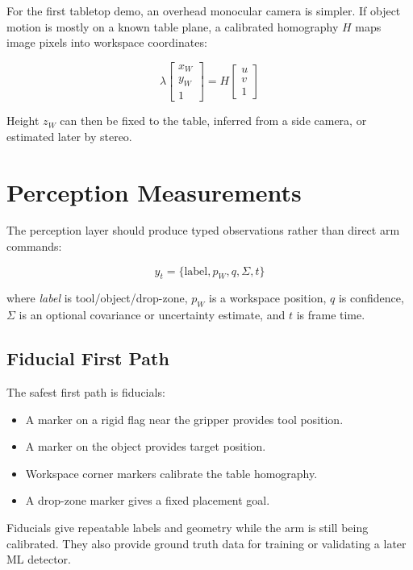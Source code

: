 \documentclass[11pt]{article}
\begin{document}
For the first tabletop demo, an overhead monocular camera is simpler. If object
motion is mostly on a known table plane, a calibrated homography $H$ maps image
pixels into workspace coordinates:

\[
    \lambda
    \begin{bmatrix}
    x_W \\ y_W \\ 1
    \end{bmatrix}
    =
    H
    \begin{bmatrix}
    u \\ v \\ 1
    \end{bmatrix}
\]

Height $z_W$ can then be fixed to the table, inferred from a side camera, or
estimated later by stereo.

\section{Perception Measurements}

The perception layer should produce typed observations rather than direct arm
commands:

\[
    y_t = \{\text{label}, p_W, q, \Sigma, t\}
\]

where \textit{label} is tool/object/drop-zone, $p_W$ is a workspace position,
$q$ is confidence, $\Sigma$ is an optional covariance or uncertainty estimate,
and $t$ is frame time.

\subsection{Fiducial First Path}

The safest first path is fiducials:

\begin{itemize}[leftmargin=*]
    \item A marker on a rigid flag near the gripper provides tool position.
    \item A marker on the object provides target position.
    \item Workspace corner markers calibrate the table homography.
    \item A drop-zone marker gives a fixed placement goal.
\end{itemize}

Fiducials give repeatable labels and geometry while the arm is still being
calibrated. They also provide ground truth data for training or validating a
later ML detector.
\end{document}
